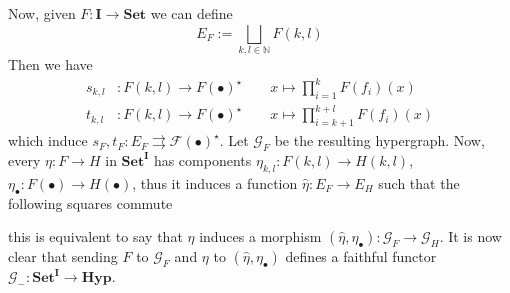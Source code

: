 \documentclass[runningheads,envcountsect]{lmcs}
\newcommand{\hyp}{\catname{Hyp}}
\newcommand{\catname}[1]{\mathbf{#1}}
\theoremstyle{plain}
\theoremstyle{definition}
\begin{document}
Now, given $F:\catname{I}\to \catname{Set}$ we can define
\[E_F:=\bigsqcup_{k,l\in \mathbb{N}}F(k,l)\]
Then we have
\begin{align*}
	s_{k,l}&:F(k,l)\to F(\bullet)^{\star} \qquad x \mapsto \prod_{i=1}^{k}F(f_i)(x)\\
	t_{k,l}&:F(k,l)\to F(\bullet)^{\star} \qquad x \mapsto \prod_{i=k+1}^{k+l}F(f_i)(x)
\end{align*}
which induce
 $s_F, t_F:E_F\rightrightarrows \mathcal{F}(\bullet)^{\star}$. Let $\mathcal{G}_F$ be the resulting hypergraph. Now, every $\eta:F\rightarrow H$ in $\catname{Set}^{\catname{I}}$ has components $\eta_{k,l}:F(k,l)\to H(k,l)$, $\eta_{\bullet}:F(\bullet)\to H(\bullet)$, thus it induces a function $\hat{\eta}:E_F\rightarrow E_H$ such that the following squares commute
\begin{center}
\end{center}
this is equivalent to say that $\eta$ induces a morphism $(\hat{\eta}, \eta_{\bullet}):\mathcal{G}_F\to \mathcal{G}_H$. It is now clear that sending $F$ to $\mathcal{G}_F$ and $\eta$ to $(\hat{\eta}, \eta_{\bullet})$ defines a faithful functor $\mathcal{G}_{-}:\catname{Set}^{\catname{I}}\to \hyp$.
\end{document}
